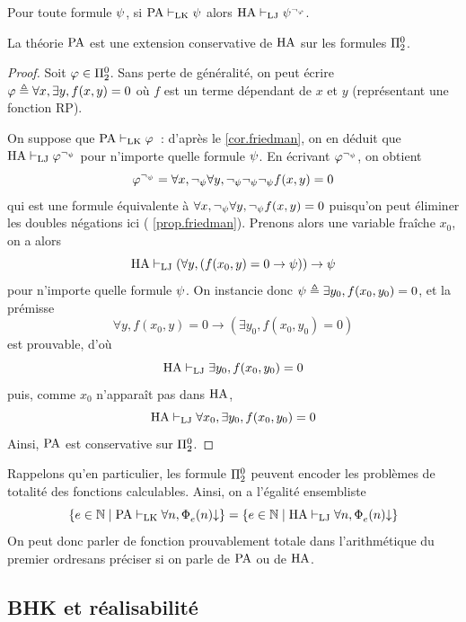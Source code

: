 \begin{corollary}\label{cor.friedman}
  Pour toute formule $\psi$, si $\operatorname{PA}\vdash_{\operatorname{LK}} \psi$ alors
  $\operatorname{HA}\vdash_{\operatorname{LJ}} \psi^{\lnot_\varphi}$.
\end{corollary}

\begin{theorem}
  La théorie $\operatorname{PA}$ est une extension conservative de $\operatorname{HA}$ sur les
  formules $\Pi^0_{2}$.
\end{theorem}

\begin{proof}
  Soit $\varphi \in \Pi^0_{2}$. Sans perte de généralité, on peut écrire
  $\varphi \triangleq \forall x, \exists y, f(x,y) = 0$ où $f$ est un terme
  dépendant de $x$ et $y$ (représentant une fonction RP).

  On suppose que $\operatorname{PA}\vdash_{\operatorname{LK}} \varphi$~: d'après le \cref{cor.friedman},
  on en déduit que $\operatorname{HA}\vdash_{\operatorname{LJ}} \varphi^{\lnot_\psi}$ pour n'importe quelle formule
  $\psi$. En écrivant $\varphi^{\lnot_\psi}$, on obtient
  \[\varphi^{\lnot_\psi} = \forall x, \lnot_\psi \forall y, \lnot_\psi
  \lnot_\psi\lnot_\psi f(x,y) = 0\]
  qui est une formule équivalente à
  $\forall x, \lnot_\psi \forall y, \lnot_\psi f(x,y) = 0$ puisqu'on peut
  éliminer les doubles négations ici ( \cref{prop.friedman}).
  Prenons alors une variable fraîche $x_0$, on a alors
  \[\operatorname{HA}\vdash_{\operatorname{LJ}} (\forall y, (f(x_0,y) = 0 \to \psi)) \to \psi\]
  pour n'importe quelle formule $\psi$. On instancie donc
  $\psi \triangleq \exists y_0, f(x_0,y_0) = 0$, et la prémisse
  \[\forall y, f(x_0,y) = 0 \to (\exists y_0, f(x_0,y_0) = 0)\]
  est prouvable, d'où
  \[\operatorname{HA} \vdash_{\operatorname{LJ}} \exists y_0, f(x_0,y_0) = 0\]
  puis, comme $x_0$ n'apparaît pas dans $\operatorname{HA}$,
  \[\operatorname{HA}\vdash_{\operatorname{LJ}} \forall x_0,\exists y_0, f(x_0,y_0) = 0\]
  Ainsi, $\operatorname{PA}$ est conservative sur $\Pi^0_{2}$.
\end{proof}

Rappelons qu'en particulier, les formule $\Pi^0_{2}$ peuvent encoder les
problèmes de totalité des fonctions calculables. Ainsi, on a l'égalité
ensembliste
\[\left\{ e \in \mathbb N \;\middle\vert\; \operatorname{PA} \vdash_{\operatorname{LK}} \forall n,\operatorname{\Phi}_{e}^{}(n)\mathbin{\downarrow} \right\}
= \left\{ e \in \mathbb N \;\middle\vert\; \operatorname{HA}\vdash_{\operatorname{LJ}}\forall n, \operatorname{\Phi}_{e}^{}(n)\mathbin{\downarrow} \right\}\]
On peut donc parler de fonction \og prouvablement totale dans l'arithmétique
du premier ordre\fg sans préciser si on parle de $\operatorname{PA}$ ou de $\operatorname{HA}$.

\subsection{BHK et réalisabilité}

